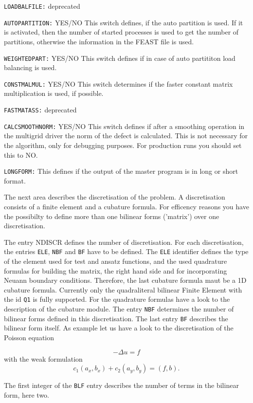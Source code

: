 \verb+LOADBALFILE:+ deprecated

\verb+AUTOPARTITION:+  YES/NO This switch defines, if the auto partition is used.
If it is activated, then the number of started processes is used to get the number
of partitions, otherwise the information in the FEAST file is used.

\verb+WEIGHTEDPART:+  YES/NO This switch defines if in case of auto partititon 
load balancing is used.

\verb+CONSTMALMUL:+  YES/NO This switch determines if the faster constant matrix
multiplication is used, if possible.

\verb+FASTMATASS:+ deprecated

\verb+CALCSMOOTHNORM:+  YES/NO This switch defines if after a smoothing operation
in the multigrid driver the norm of the defect is calculated. This is not
necessary for the algorithm, only for debugging purposes. For production runs
you should set this to NO.

\verb+LONGFORM:+ This defines if the output of the master program is in long or
short format.

The next area describes the discretisation of the problem. A discretisation
consists of a finite element and a cubature formula. For efficency reasons
you have the possibilty to define more than one bilinear forms ('matrix')
over one discretisation. 

The entry NDISCR defines the number of discretisation. For each
discretisation, the entries \verb+ELE+, \verb+NBF+ and \verb+BF+ have to be defined. 
The \verb+ELE+
identifier defines the type of the element used for test and ansatz functions,
and the used quadrature formulas for building the matrix, the right hand side and for 
incorporating Neuann boundary conditions. Therefore, the last cubature formula maut be a
1D cubature formula.
Currently only the quadraliteral bilinear Finite Element with the id \verb+Q1+ is fully
supported. For the quadrature formulas have a look to the description of the
cubature module. The entry \verb+NBF+ determines the number of bilinear forms defined
in this discretisation. The last entry \verb+BF+ describes the bilinear form
itself. As example let us have a look to the discretisation of the 
Poisson equation

$$
        -\Delta u = f 
$$
with the weak formulation
$$
c_1 (a_x,b_x) + c_2 ( a_y, b_y ) = (f,b). 
$$

The first integer of the \verb+BLF+ entry describes the number of terms in the bilinear form,
here two.

